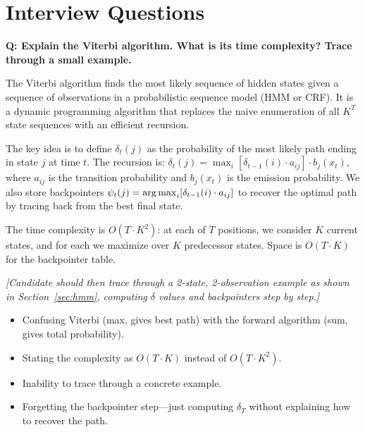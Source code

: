 \section{Interview Questions}
\label{sec:stat_nlp_questions}

\begin{interviewq}
\textbf{Q: Explain the Viterbi algorithm.  What is its time complexity?
Trace through a small example.}

 \quad {} \quad \badgefreq{\freqmed}

\stronganswer
The Viterbi algorithm finds the most likely sequence of hidden states given a
sequence of observations in a probabilistic sequence model (HMM or CRF).  It
is a dynamic programming algorithm that replaces the naive enumeration of all
$K^T$ state sequences with an efficient recursion.

The key idea is to define $\delta_t(j)$ as the probability of the most likely
path ending in state $j$ at time $t$.  The recursion is:
$\delta_t(j) = \max_i [\delta_{t-1}(i) \cdot a_{ij}] \cdot b_j(x_t)$, where
$a_{ij}$ is the transition probability and $b_j(x_t)$ is the emission probability.
We also store backpointers $\psi_t(j) = \operatorname*{arg\,max}_i [\delta_{t-1}(i) \cdot a_{ij}]$
to recover the optimal path by tracing back from the best final state.

The time complexity is $O(T \cdot K^2)$: at each of $T$ positions, we consider
$K$ current states, and for each we maximize over $K$ predecessor states.
Space is $O(T \cdot K)$ for the backpointer table.

\emph{[Candidate should then trace through a 2-state, 2-observation example
as shown in Section~\ref{sec:hmm}, computing $\delta$ values and backpointers
step by step.]}

\redflags
\begin{itemize}
    \item Confusing Viterbi (max, gives best path) with the forward algorithm
          (sum, gives total probability).
    \item Stating the complexity as $O(T \cdot K)$ instead of $O(T \cdot K^2)$.
    \item Inability to trace through a concrete example.
    \item Forgetting the backpointer step---just computing $\delta_T$ without
          explaining how to recover the path.
\end{itemize}


\end{interviewq}
